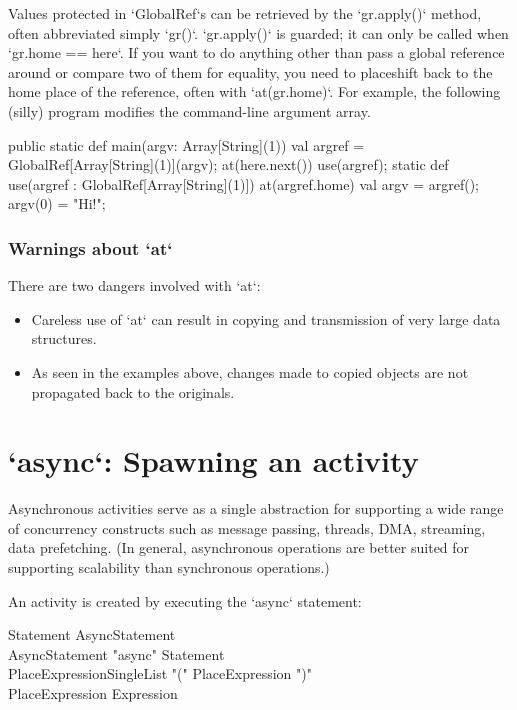 Values protected in \xcd`GlobalRef`s can be retrieved by the \xcd`gr.apply()`
method, often abbreviated simply \xcd`gr()`.  \xcd`gr.apply()` is guarded; it can
only be called when \xcd`gr.home == here`.  If you  want to do anything other
than pass a global reference around or compare two of them for equality, you
need to placeshift back to the home place of the reference, often with
\xcd`at(gr.home)`.   For example, the following (silly) program modifies the
command-line argument array.

\begin{xten}
  public static def main(argv: Array[String](1)) {
    val argref = GlobalRef[Array[String](1)](argv);
    at(here.next()) use(argref);
  }
  static def use(argref : GlobalRef[Array[String](1)]) {
    at(argref.home) {
      val argv = argref();
      argv(0) = "Hi!";
    }
  }
\end{xten}





\subsubsection{Warnings about \xcd`at`}
There are two dangers involved with \xcd`at`: 
\begin{itemize}
\item Careless use of \xcd`at` can result in copying and transmission
of very large data structures.  
\item As seen in the examples above, changes made to copied objects are not
      propagated back to the originals.   
\end{itemize}

\section{\xcd`async`: Spawning an activity}\label{AsynchronousActivity}\label{AsyncActivity}

Asynchronous activities serve as a single abstraction for supporting a
wide range of concurrency constructs such as message passing, threads,
DMA, streaming, data prefetching. (In general, asynchronous operations
are better suited for supporting scalability than synchronous
operations.)

An activity is created by executing the \xcd`async` statement: 

\begin{grammar}
Statement \: AsyncStatement \\
AsyncStatement \: \xcd"async"  Statement \\
PlaceExpressionSingleList \: \xcd"(" PlaceExpression \xcd")" \\
PlaceExpression \: Expression 
\end{grammar} 


